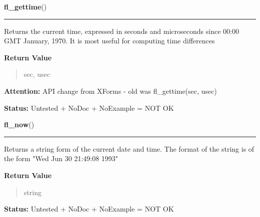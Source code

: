     \label{xformslib:library:fl_gettime}

    \vspace{0.5ex}

\hspace{.8\funcindent}\begin{boxedminipage}{\funcwidth}

    \raggedright \textbf{fl\_gettime}()

    \vspace{-1.5ex}

    \rule{\textwidth}{0.5\fboxrule}
\setlength{\parskip}{2ex}
    Returns the current time, expressed in seconds and microseconds since 
    00:00 GMT January, 1970. It is most useful for computing time 
    differences

\setlength{\parskip}{1ex}
      \textbf{Return Value}
    \vspace{-1ex}

      \begin{quote}
      sec, usec

      \end{quote}

\textbf{Attention:} API change from XForms - old was fl\_gettime(sec, usec)



\textbf{Status:} Untested + NoDoc + NoExample = NOT OK



    \end{boxedminipage}

    \label{xformslib:library:fl_now}

    \vspace{0.5ex}

\hspace{.8\funcindent}\begin{boxedminipage}{\funcwidth}

    \raggedright \textbf{fl\_now}()

    \vspace{-1.5ex}

    \rule{\textwidth}{0.5\fboxrule}
\setlength{\parskip}{2ex}
    Returns a string form of the current date and time. The format of the 
    string is of the form "Wed Jun 30 21:49:08 1993"

\setlength{\parskip}{1ex}
      \textbf{Return Value}
    \vspace{-1ex}

      \begin{quote}
      string

      \end{quote}

\textbf{Status:} Untested + NoDoc + NoExample = NOT OK



    \end{boxedminipage}

